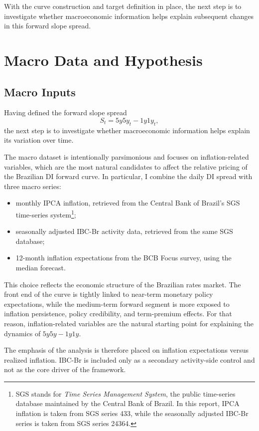 \documentclass[11pt]{article}
\begin{document}
	With the curve construction and target definition in place, the next step is to investigate whether macroeconomic information helps explain subsequent changes in this forward slope spread.
	
	\section{Macro Data and Hypothesis}
	\label{sec:macro_hypothesis}
	
	\subsection{Macro Inputs}
	\label{subsec:macro_inputs}
	
	Having defined the forward slope spread
	\[
	S_t = 5y5y_t - 1y1y_t,
	\]
	the next step is to investigate whether macroeconomic information helps explain its variation over time.
	
	The macro dataset is intentionally parsimonious and focuses on inflation-related variables, which are the most natural candidates to affect the relative pricing of the Brazilian DI forward curve. In particular, I combine the daily DI spread with three macro series:
	
	\begin{itemize}
		\item monthly IPCA inflation, retrieved from the Central Bank of Brazil's SGS time-series system\footnote{SGS stands for \emph{Time Series Management System}, the public time-series database maintained by the Central Bank of Brazil. In this report, IPCA inflation is taken from SGS series 433, while the seasonally adjusted IBC-Br series is taken from SGS series 24364.};
		\item seasonally adjusted IBC-Br activity data, retrieved from the same SGS database;
		\item 12-month inflation expectations from the BCB Focus survey, using the median forecast.
	\end{itemize}
	
	This choice reflects the economic structure of the Brazilian rates market. The front end of the curve is tightly linked to near-term monetary policy expectations, while the medium-term forward segment is more exposed to inflation persistence, policy credibility, and term-premium effects. For that reason, inflation-related variables are the natural starting point for explaining the dynamics of \(5y5y - 1y1y\).
	
	The emphasis of the analysis is therefore placed on inflation expectations versus realized inflation. IBC-Br is included only as a secondary activity-side control and not as the core driver of the framework.
	
\end{document}
